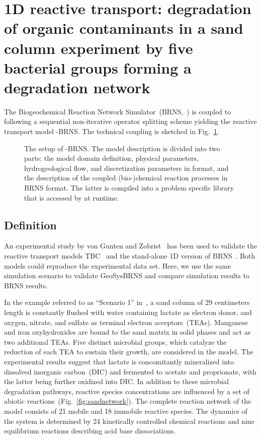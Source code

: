 \section[Degradation Network (1D)]{1D reactive transport: degradation of organic contaminants in a sand column experiment by five bacterial groups forming a degradation network}
\label{l_s_benchmark_1d_network}


The Biogeochemical Reaction Network
Simulator~(BRNS,~\cite{Aguilera2005,Regnier2002}) is coupled to \GeoSys
following a sequential non-iterative operator splitting scheme yielding the
reactive transport model \GeoSys-BRNS. The technical
coupling is sketched in Fig.~\ref{fig:GeoSysBRNSSetup}.

\begin{figure}[htb]
\centering
{}
\caption{
The setup of \GeoSys-BRNS. The model description is divided into two parts: the
model domain definition, physical parameters, hydrogeological flow, and
discretization parameters in \GeoSys format, and the description of the coupled
(bio-)chemical reaction processes in BRNS format. The latter is compiled into a
problem specific library that is accessed by \GeoSys at runtime.
}
\label{fig:GeoSysBRNSSetup}
\end{figure}

\subsection{Definition}

An experimental study by von Gunten and Zobrist~\cite{Gunten1993} has been used to validate the reactive transport models TBC~\cite{Schaefer1998b} and the stand-alone 1D version of BRNS~\cite{Thullner2005}.  Both models could reproduce the experimental data set. Here, we use the same simulation scenario to validate
GeoSysBRNS and compare simulation results to BRNS results.

In the example referred to as ``Scenario 1'' in~\cite{Thullner2005}, a sand
column of 29 centimeters length is constantly flushed with water containing
lactate as electron donor, and oxygen, nitrate, and sulfate as terminal
electron acceptors~(TEAs). Manganese and iron oxyhydroxides are bound to the
sand matrix in solid phases and act as two additional TEAs. Five distinct
microbial groups, which catalyze the reduction of each TEA to sustain their
growth, are considered in the model. The experimental results suggest that
lactate is concomitantly mineralized into dissolved inorganic carbon~(DIC) and
fermented to acetate and proprionate, with the latter being further oxidized
into DIC.  In addition to these microbial degradation pathways, reactive
species concentrations are influenced by a set of abiotic
reactions~(Fig.~\ref{fig:sandnetwork}).  The complete reaction network of the
model consists of 21 mobile and 18 immobile reactive species. The dynamics of
the system is determined by 24 kinetically controlled chemical reactions and
nine equilibrium reactions describing acid base dissociations.


